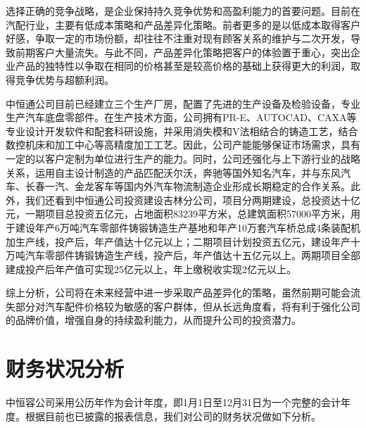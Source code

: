选择正确的竞争战略，是企业保持持久竞争优势和高盈利能力的首要问题。目前在汽配行业，主要有低成本策略和产品差异化策略。前者更多的是以低成本取得客户好感，争取一定的市场份额，却往往不注重对现有顾客关系的维护与二次开发，导致前期客户大量流失。与此不同，产品差异化策略把客户的体验置于重心，突出企业产品的独特性以争取在相同的价格甚至是较高价格的基础上获得更大的利润，取得竞争优势与超额利润。

中恒通公司目前已经建立三个生产厂房，配置了先进的生产设备及检验设备，专业生产汽车底盘零部件。在生产技术方面，公司拥有PR-E、AUTOCAD、CAXA等专业设计开发软件和配套科研设施，并采用消失模和V法相结合的铸造工艺，结合数控机床和加工中心等高精度加工工艺。因此，公司产能能够保证市场需求，具有一定的以客户定制为单位进行生产的能力。同时，公司还强化与上下游行业的战略关系，运用自主设计制造的产品匹配沃尔沃，奔驰等国外知名汽车，并与东风汽车、长春一汽、金龙客车等国内外汽车物流制造企业形成长期稳定的合作关系。此外，我们还看到中恒通公司投资建设吉林分公司，项目分两期建设，总投资达十亿元，一期项目总投资五亿元，占地面积83239平方米，总建筑面积57000平方米，用于建设年产6万吨汽车零部件铸锻铸造生产基地和年产10万套汽车桥总成4条装配机加生产线，投产后，年产值达十亿元以上；二期项目计划投资五亿元，建设年产十万吨汽车零部件铸锻铸造生产线，投产后，年产值达十五亿元以上。两期项目全部建成投产后年产值可实现25亿元以上，年上缴税收实现2亿元以上。

综上分析，公司将在未来经营中进一步采取产品差异化的策略，虽然前期可能会流失部分对汽车配件价格较为敏感的客户群体，但从长远角度看，将有利于强化公司的品牌价值，增强自身的持续盈利能力，从而提升公司的投资潜力。

\section{财务状况分析}{}
中恒容公司采用公历年作为会计年度，即1月1日至12月31日为一个完整的会计年度。根据目前也已披露的报表信息，我们对公司的财务状况做如下分析。



